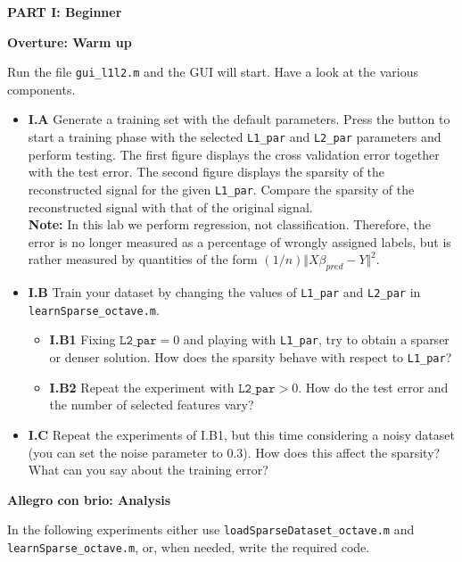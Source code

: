 \documentclass[DIN, pagenumber=false, fontsize=11pt, parskip=half]{scrartcl}
\newcommand{\mysection}[1]{\noindent\large\textbf{#1}}
\begin{document}
\newpage
\begin{center}
\large\textbf{PART I: Beginner}
\end{center}

\mysection{Overture: Warm up}

Run the file \texttt{gui\_l1l2.m} and the GUI will start. Have a look at the various components.

\begin{itemize}
	\item \textbf{I.A} Generate a training set with the default parameters.
	Press the  button to start a training phase with the selected \texttt{L1\_par} and \texttt{L2\_par} parameters and perform testing.
	The first figure displays the cross validation error together with the test error.
	The second figure displays the sparsity of the reconstructed signal for the given \texttt{L1\_par}.
	Compare the sparsity of the reconstructed signal with that of the original signal.\\
	\textbf{Note:} In this lab we perform regression, not classification.
  Therefore, the error is no longer measured as a percentage of wrongly assigned labels, but is rather measured by quantities of the form $(1/n)\Vert X \beta_{pred} - Y \Vert^2$.

	\item \textbf{I.B} Train your dataset by changing the values of \texttt{L1\_par} and \texttt{L2\_par} in \texttt{learnSparse\_octave.m}.
	\begin{itemize}
		\item \textbf{I.B1} Fixing $\texttt{L2\_par}=0$ and playing with \texttt{L1\_par}, try to obtain a sparser or denser solution.
    How does the sparsity behave with respect to \texttt{L1\_par}?
		\item \textbf{I.B2} Repeat the experiment with $\texttt{L2\_par}>0$.
    How do the test error and the number of selected features vary?
\end{itemize}

	\item \textbf{I.C} Repeat the experiments of I.B1, but this time considering a noisy dataset (you can set the noise parameter to 0.3).
	How does this affect the sparsity?
	What can you say about the training error?

\end{itemize}



\mysection{Allegro con brio: Analysis}

In the following experiments either use \texttt{loadSparseDataset\_octave.m} and \texttt{learnSparse\_octave.m}, or, when needed, write the required code.
\end{document}
